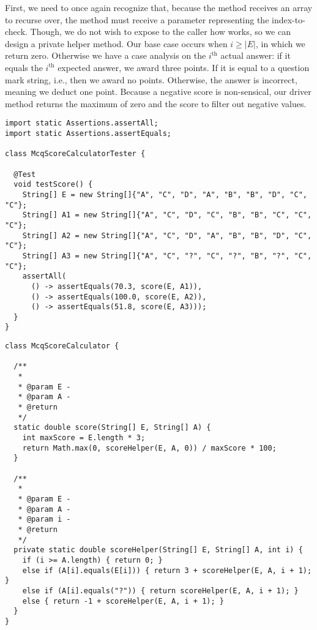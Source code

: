 First, we need to once again recognize that, because the method receives an array to recurse over, the method must receive a parameter representing the index-to-check. Though, we do not wish to expose to the caller how  works, so we can design a private helper method. Our base case occurs when $i \geq |E|$, in which we return zero. Otherwise we have a case analysis on the $i^\text{th}$ actual answer: if it equals the $i^\text{th}$ expected answer, we award three points. If it is equal to a question mark string, i.e.,  then we award no points. Otherwise, the answer is incorrect, meaning we deduct one point. Because a negative score is non-sensical, our driver method returns the maximum of zero and the score to filter out negative values.

\begin{cl}[]{}
\begin{lstlisting}[language=MyJava]
import static Assertions.assertAll;
import static Assertions.assertEquals;

class McqScoreCalculatorTester {

  @Test
  void testScore() {    
    String[] E = new String[]{"A", "C", "D", "A", "B", "B", "D", "C", "C"};
    String[] A1 = new String[]{"A", "C", "D", "C", "B", "B", "C", "C", "C"};
    String[] A2 = new String[]{"A", "C", "D", "A", "B", "B", "D", "C", "C"};
    String[] A3 = new String[]{"A", "C", "?", "C", "?", "B", "?", "C", "C"};
    assertAll(
      () -> assertEquals(70.3, score(E, A1)),
      () -> assertEquals(100.0, score(E, A2)),
      () -> assertEquals(51.8, score(E, A3)));
  }
}
\end{lstlisting}
\end{cl}

\begin{cl}[]{}
\begin{lstlisting}[language=MyJava]
class McqScoreCalculator {

  /**
   *
   * @param E - 
   * @param A - 
   * @return
   */
  static double score(String[] E, String[] A) {
    int maxScore = E.length * 3;
    return Math.max(0, scoreHelper(E, A, 0)) / maxScore * 100;
  }

  /**
   *
   * @param E - 
   * @param A - 
   * @param i - 
   * @return
   */
  private static double scoreHelper(String[] E, String[] A, int i) {
    if (i >= A.length) { return 0; }
    else if (A[i].equals(E[i])) { return 3 + scoreHelper(E, A, i + 1); }
    else if (A[i].equals("?")) { return scoreHelper(E, A, i + 1); }
    else { return -1 + scoreHelper(E, A, i + 1); }
  }
}
\end{lstlisting}
\end{cl}

